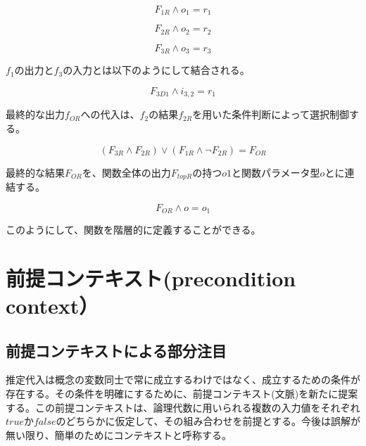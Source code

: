 \documentclass[12pt]{article}
\begin{document}
\begin{equation} F_{1R} \wedge o_1 = r_1 \end{equation}

\begin{equation} F_{2R} \wedge o_2 = r_2 \end{equation}

\begin{equation} F_{3R} \wedge o_3 = r_3 \end{equation}

\(f_1\)の出力と\(f_3\)の入力とは以下のようにして結合される。

\begin{equation} F_{3D1} \wedge i_{3,2} = r_1 \end{equation}

最終的な出力\(f_{OR}\)への代入は、\(f_2\)の結果\(f_{2R}\)を用いた条件判断によって選択制御する。

\begin{equation} (F_{3R} \wedge F_{2R} ) \vee ( F_{1R} \wedge \neg F_{2R}) = F_{OR} \end{equation}

最終的な結果\(F_{OR}\)を、関数全体の出力\(F_{topR}\)の持つ\(o1\)と関数パラメータ型\(o\)とに連結する。

\begin{equation} F_{OR} \wedge o = o_1 \end{equation}

このようにして、関数を階層的に定義することができる。

\clearpage
\section{前提コンテキスト(precondition
context）}\label{ux524dux63d0ux30b3ux30f3ux30c6ux30adux30b9ux30c8precondition-context}

\subsection{前提コンテキストによる部分注目}\label{ux524dux63d0ux30b3ux30f3ux30c6ux30adux30b9ux30c8ux306bux3088ux308bux90e8ux5206ux6ce8ux76ee}

推定代入は概念の変数同士で常に成立するわけではなく、成立するための条件が存在する。その条件を明確にするために、前提コンテキスト(文脈)を新たに提案する。この前提コンテキストは、論理代数に用いられる複数の入力値をそれぞれ\(true\)か\(false\)のどちらかに仮定して、その組み合わせを前提とする。今後は誤解が無い限り、簡単のためにコンテキストと呼称する。
\end{document}
